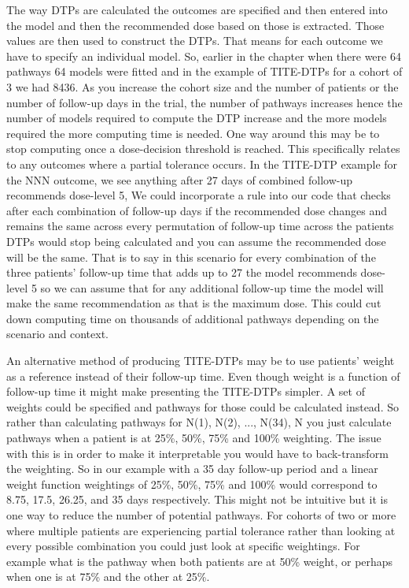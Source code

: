 The way DTPs are calculated the outcomes are specified and then entered into the model and then the recommended dose based on those is extracted. Those values are then used to construct the DTPs. That means for each outcome we have to specify an individual model. So, earlier in the chapter when there were 64 pathways 64 models were fitted and in the example of TITE-DTPs for a cohort of 3 we had 8436. As you increase the cohort size and the number of patients or the number of follow-up days in the trial, the number of pathways increases hence the number of models required to compute the DTP increase and the more models required the more computing time is needed. One way around this may be to stop computing once a dose-decision threshold is reached. This specifically relates to any outcomes where a partial tolerance occurs.  In the TITE-DTP example for the NNN outcome, we see anything after 27 days of combined follow-up recommends dose-level 5, We could incorporate a rule into our code that checks after each combination of follow-up days if the recommended dose changes and remains the same across every permutation of follow-up time across the patients DTPs would stop being calculated and you can assume the recommended dose will be the same. That is to say in this scenario for every combination of the three patients' follow-up time that adds up to 27 the model recommends dose-level 5 so we can assume that for any additional follow-up time the model will make the same recommendation as that is the maximum dose. This could cut down computing time on thousands of additional pathways depending on the scenario and context. 

An alternative method of producing TITE-DTPs may be to use patients' weight as a reference instead of their follow-up time. Even though weight is a function of follow-up time it might make presenting the TITE-DTPs simpler. A set of weights could be specified and pathways for those could be calculated instead. So rather than calculating pathways for N(1), N(2), ..., N(34), N you just calculate pathways when a patient is at 25\%, 50\%, 75\% and 100\% weighting. The issue with this is in order to make it interpretable you would have to back-transform the weighting. So in our example with a 35 day follow-up period and a linear weight function weightings of 25\%, 50\%, 75\% and 100\% would correspond to 8.75, 17.5, 26.25, and 35 days respectively. This might not be intuitive but it is one way to reduce the number of potential pathways. For cohorts of two or more where multiple patients are experiencing partial tolerance rather than looking at every possible combination you could just look at specific weightings. For example what is the pathway when both patients are at 50\% weight, or perhaps when one is at 75\% and the other at 25\%.  

